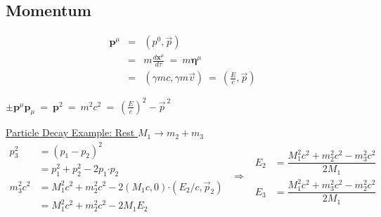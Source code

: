 \documentclass[12pt]{article}
\newcommand{\dotP}{\boldsymbol \cdot}		%
\newcommand{\contra}[1]{\boldsymbol {#1}^{\mu}}	%
\newcommand{\covar}[1]{\boldsymbol {#1}_{\mu}}		%
\begin{document}
\subsection{Momentum}
\vspace{-5pt}
\begin{minipage}{0.45\textwidth}
	\begin{eqnarray*}
	\contra{p} &=& (p^0, \vec{p}) \\[5pt]
		&=& m\frac{d\contra{x}}{d\tau} \ =\  m \contra{\eta} \\[5pt]
		&=& \boxed{ (\gamma mc, \gamma m\vec{v}) \ =\  \left( \tfrac{E}{c}, \vec{p} \right) }
	\end{eqnarray*}
\end{minipage}
\hfill
\begin{minipage}{0.49\textwidth}
	\(\pm \contra{p}\covar{p} \ =\ \boxed{ {\boldsymbol{p}}^2 \ =\ m^2c^2 \ =\  \left( \tfrac{E}{c} \right)^2 - \vec{p}^{\ 2}}\)

	\vspace{20pt}
\end{minipage}

\vspace{20pt}
\indent \underline{Particle Decay Example: Rest \(M_1 \rightarrow m_2 + m_3\)}\\[10pt]
\indent \(\begin{aligned}
	p_3^2 &= (p_1 - p_2)^2 \\[5pt]
	&= p_1^2 + p_2^2 - 2 p_1 \dotP p_2\\[5pt]
	m_3^2c^2 &= M_1^2c^2 + m_2^2c^2 - 2 (M_1 c,0) \dotP (E_2/c,\vec{p}_2)\\[5pt]
	&= M_1^2c^2 + m_2^2c^2 - 2 M_1 E_2
\end{aligned} \ \ \Rightarrow \ \
\boxed{ \begin{aligned}
	E_2 &= \dfrac{M_1^2c^2 + m_2^2c^2 - m_3^2c^2 }{2M_1}\\[5pt]
	E_3 &= \dfrac{M_1^2c^2 + m_3^2c^2 - m_2^2c^2 }{2M_1}
\end{aligned} }\)

\end{document}
